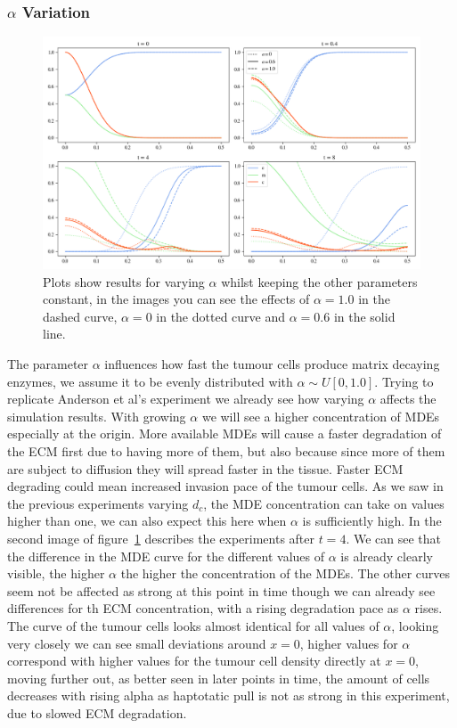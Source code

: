 \subsubsection*{$\alpha$ Variation}
\begin{figure}[h]
    \centering
    \includegraphics[width=\textwidth]{resources/images/alpha_variation.png}
    \caption{Plots show results for varying $\alpha$ whilst keeping the other parameters constant, in the images you can see the effects of $\alpha=1.0$ in the dashed curve, $\alpha=0$ in the dotted curve and $\alpha=0.6$ in the solid line.}
    \label{fig:alpha_variation}
\end{figure}
The parameter $\alpha$ influences how fast the tumour cells produce matrix decaying enzymes, we assume it to be evenly distributed with $\alpha \sim U[0, 1.0]$. Trying to replicate Anderson et al's experiment we already see how varying $\alpha$ affects the simulation results. With growing $\alpha$ we will see a higher concentration of MDEs especially at the origin. More available MDEs will cause a faster degradation of the ECM first due to having more of them, but also because since more of them are subject to diffusion they will spread faster in the tissue. Faster ECM degrading could mean increased invasion pace of the tumour cells. As we saw in the previous experiments varying $d_c$, the MDE concentration can take on values higher than one, we can also expect this here when $\alpha$ is sufficiently high. \newline 
In the second image of figure~\ref{fig:alpha_variation} describes the experiments after $t=4$. We can see that the difference in the MDE curve for the different values of $\alpha$ is already clearly visible, the higher $\alpha$ the higher the concentration of the MDEs. The other curves seem not be affected as strong at this point in time though we can already see differences for th ECM concentration, with a rising degradation pace as $\alpha$ rises. The curve of the tumour cells looks almost identical for all values of $\alpha$, looking very closely we can see small deviations around $x=0$, higher values for $\alpha$ correspond with higher values for the tumour cell density directly at $x=0$, moving further out, as better seen in later points in time, the amount of cells decreases with rising alpha as haptotatic pull is not as strong in this experiment, due to slowed ECM degradation. \newline 

